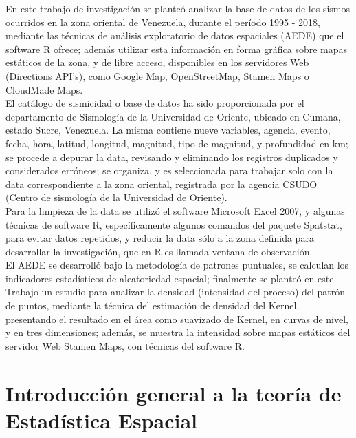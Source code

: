 \documentclass[12pt]{report}
\begin{document}
	
 En este trabajo de investigación se planteó analizar la base de datos de los 	sismos ocurridos en la zona oriental de Venezuela, durante el período  1995 - 2018, mediante las técnicas de análisis exploratorio de datos espaciales (AEDE) que el software R ofrece;   además  utilizar esta información en forma gráfica sobre mapas estáticos de la zona, y de libre acceso, disponibles en los servidores Web (Directions API's),  como Google Map, OpenStreetMap, Stamen Maps o CloudMade Maps.\\
 
  El  catálogo de sismicidad o base de datos ha sido proporcionada por el departamento de Sismología de la Universidad de Oriente, ubicado en Cumana, estado Sucre, Venezuela. La misma  contiene nueve variables,  agencia, evento, fecha,  hora,  latitud, longitud, magnitud, tipo de magnitud, y profundidad en km; se procede a depurar la data,  revisando y eliminando los registros duplicados y considerados erróneos;  se organiza, y es seleccionada para trabajar solo con la data correspondiente a la zona oriental,  registrada por la agencia CSUDO (Centro de sismología de la Universidad de Oriente). \\
 
Para la limpieza de la data se utilizó el software  Microsoft Excel 2007, y algunas técnicas de software R, específicamente algunos comandos del paquete Spatstat, para evitar datos repetidos, y reducir la data sólo a la zona definida para desarrollar la investigación, que en R es llamada ventana de observación.\\

El AEDE se desarrolló bajo la metodología de  patrones puntuales, se calculan los indicadores estadísticos  de aleatoriedad espacial; finalmente se planteó en este Trabajo un estudio para analizar la densidad (intensidad del proceso) del patrón de puntos, mediante la técnica del estimación de densidad del Kernel, presentando el resultado en el área como suavizado de Kernel,  en curvas de nivel, y en tres dimensiones; además, se muestra la intensidad sobre mapas estáticos del servidor Web Stamen Maps, con técnicas del software R.

	
	
	
	
	
	

	
	
	\chapter{Introducción general a la teoría de Estadística Espacial}
	
\end{document}
